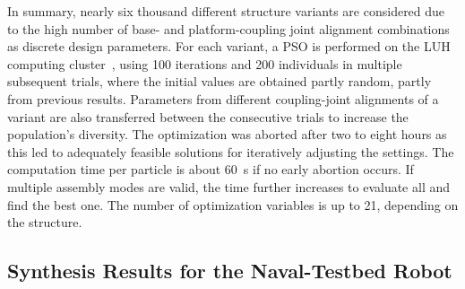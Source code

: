 In summary, nearly six thousand different structure variants are considered due to the high number of base- and platform-coupling joint alignment combinations as discrete design parameters.
For each variant, a PSO is performed on the LUH computing cluster~\cite{LUISCLUSTER}, using 100 iterations and 200 individuals in multiple subsequent trials, where the initial values are obtained partly random, partly from previous results.
Parameters from different coupling-joint alignments of a variant are also transferred between the consecutive trials to increase the population's diversity.
The optimization was aborted after two to eight hours as this led to adequately feasible solutions for iteratively adjusting the settings.
The computation time per particle is about \SI{60}{\second} if no early abortion occurs.
If multiple assembly modes are valid, the time further increases to evaluate all and find the best one.
%
The number of optimization variables is up to 21, depending on the structure.


\subsection{Synthesis Results for the Naval-Testbed Robot}
\label{sec:eval_lufi_results}

%
%
%
%
%

